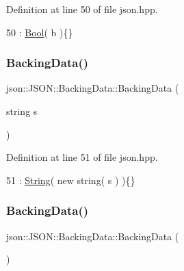 Definition at line 50 of file json.\+hpp.


\begin{DoxyCode}
50 : \mbox{\hyperlink{unionjson_1_1_j_s_o_n_1_1_backing_data_a0659fafaedb7de535ae3e79e4ff4688c}{Bool}}( b )\{\}
\end{DoxyCode}
\mbox{\label{unionjson_1_1_j_s_o_n_1_1_backing_data_a05c304ee380de872456ce7679c48b2ce}} 
\subsubsection{\texorpdfstring{Backing\+Data()}{BackingData()}\hspace{0.1cm}{\footnotesize\ttfamily [4/5]}}
{\footnotesize\ttfamily json\+::\+J\+S\+O\+N\+::\+Backing\+Data\+::\+Backing\+Data (\begin{DoxyParamCaption}\item[{string}]{s }\end{DoxyParamCaption})\hspace{0.3cm}{\ttfamily [inline]}}



Definition at line 51 of file json.\+hpp.


\begin{DoxyCode}
51 : \mbox{\hyperlink{unionjson_1_1_j_s_o_n_1_1_backing_data_a883c18d113d2e55767a9530f06a9c772}{String}}( \textcolor{keyword}{new} \textcolor{keywordtype}{string}( s ) )\{\}
\end{DoxyCode}
\mbox{\label{unionjson_1_1_j_s_o_n_1_1_backing_data_aeeb02720b7de2606b868f6a2d11c83ea}} 
\subsubsection{\texorpdfstring{Backing\+Data()}{BackingData()}\hspace{0.1cm}{\footnotesize\ttfamily [5/5]}}
{\footnotesize\ttfamily json\+::\+J\+S\+O\+N\+::\+Backing\+Data\+::\+Backing\+Data (\begin{DoxyParamCaption}{ }\end{DoxyParamCaption})\hspace{0.3cm}{\ttfamily [inline]}}




